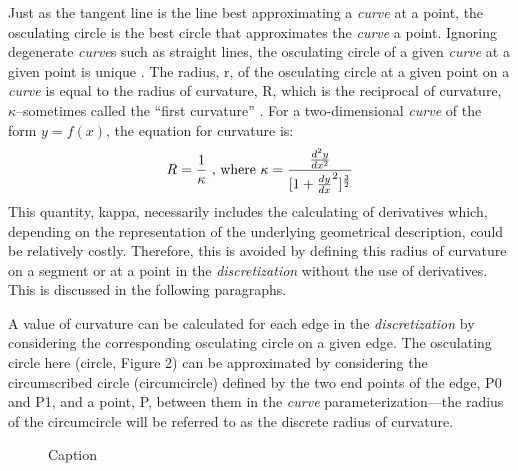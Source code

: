 \documentclass[preprint,12pt]{elsarticle}
\begin{document}
\noindent Just as the tangent line is the line best approximating a \textit{curve} at a point, the osculating circle is the best circle that approximates the \textit{curve} a point. Ignoring degenerate \textit{curve}s such as straight lines, the osculating circle of a given \textit{curve} at a given point is unique \cite{gray97}. The radius, r, of the osculating circle at a given point on a \textit{curve} is equal to the radius of curvature, R, which is the reciprocal of curvature, $\kappa$--sometimes called the ``first curvature'' \cite{kreyszig91}. For a two-dimensional \textit{curve} of the form $y=f(x)$, the equation for curvature is:
\[ 
R=\frac{1}{\kappa} \textnormal{ , where } \kappa=\frac{\frac{d^2y}{dx^2}}{[1+\frac{dy}{dx}^2 ]^\frac{3}{2}} 
\]
\noindent This quantity, kappa, necessarily includes the calculating of derivatives which, depending on the representation of the underlying geometrical description, could be relatively costly. Therefore, this is avoided by defining this radius of curvature on a segment or at a point in the \textit{discretization} without the use of derivatives. This is discussed in the following paragraphs.

A value of curvature can be calculated for each edge in the \textit{discretization} by considering the corresponding osculating circle on a given edge. The osculating circle here (circle, Figure 2) can be approximated by considering the circumscribed circle (circumcircle) \cite{casey1888} defined by the two end points of the edge, P0 and P1, and a point, P, between them in the \textit{curve} parameterization—the radius of the circumcircle will be referred to as the discrete radius of curvature.

\begin{figure}[h!]
  \caption{\label{CircumscribedCircle} Caption}
\end{figure}
\end{document}
